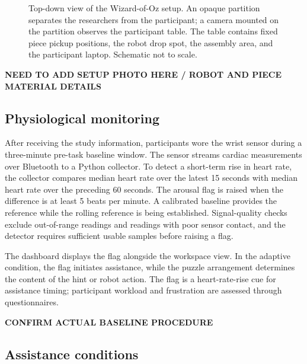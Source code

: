 \documentclass[sigconf,anonymous]{aamas}
\begin{document}
\begin{figure}[t]
\centering
\begingroup
\resizebox{.83\textwidth}{!}{}
\endgroup
\caption{Top-down view of the Wizard-of-Oz setup. An opaque partition separates the researchers from the participant; a camera mounted on the partition observes the participant table. The table contains fixed piece pickup positions, the robot drop spot, the assembly area, and the participant laptop. Schematic not to scale.}
\label{fig:setup}
\end{figure}

\textbf{NEED TO ADD SETUP PHOTO HERE / ROBOT AND PIECE MATERIAL DETAILS}

\subsection{Physiological monitoring}

After receiving the study information, participants wore the wrist sensor during a three-minute pre-task baseline window. The sensor streams cardiac measurements over Bluetooth to a Python collector. To detect a short-term rise in heart rate, the collector compares median heart rate over the latest 15 seconds with median heart rate over the preceding 60 seconds. The arousal flag is raised when the difference is at least 5 beats per minute. A calibrated baseline provides the reference while the rolling reference is being established. Signal-quality checks exclude out-of-range readings and readings with poor sensor contact, and the detector requires sufficient usable samples before raising a flag.

The dashboard displays the flag alongside the workspace view. In the adaptive condition, the flag initiates assistance, while the puzzle arrangement determines the content of the hint or robot action. The flag is a heart-rate-rise cue for assistance timing; participant workload and frustration are assessed through questionnaires.

\textbf{CONFIRM ACTUAL BASELINE PROCEDURE}

\subsection{Assistance conditions}
\end{document}
